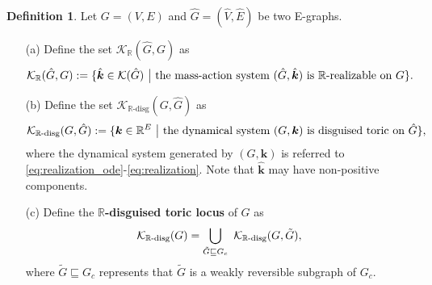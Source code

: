 \documentclass[11pt]{article}
\theoremstyle{plain}
\theoremstyle{definition}
\newtheorem{definition}[theorem]{Definition}
\theoremstyle{remark}
\newcommand\RR{\mathbb{R}}
\newcommand\bk{\boldsymbol{k}}
\newcommand{\mK}{\mathcal{K}}
\newcommand{\dK}{\mathcal{K}_{\RR\text{-disg}}}
\newcommand{\defi}{\textbf}
\begin{document}
\begin{definition} 
\label{def:de_realizable}
Let $G =(V,E)$ and $\hat{G} =(\hat{V}, \hat{E})$ be two E-graphs.
\begin{enumerate}


\item[(a)] Define the set $\mK_{\RR}(\hat{G}, G)$ as 
\begin{equation} \notag
\mK_{\RR}(\hat{G}, G) := \{ \hat{\bk} \in \mK (\hat{G}) \ \big| \ \text{the mass-action system } (\hat{G}, \hat{\bk}) \ \text{is $\RR$-realizable on } G \}.
\end{equation}

%

\item[(b)] Define the set $\dK(G, \hat{G})$ as
\begin{equation} \notag
\dK(G, \hat{G}) := \{ \bk \in \mathbb{R}^{E} \ \big| \ \text{the dynamical system} \ (G, \bk) \ \text{is disguised toric on } \hat{G} \},
\end{equation}
where the dynamical system generated by $(G, \bk)$ is referred to \eqref{eq:realization_ode}-\eqref{eq:realization}. Note that $\hat{\bk}$ may have non-positive components.


\item[(c)] Define the \defi{$\RR$-disguised toric locus} of $G$ as
\begin{equation} \notag
\dK(G) = \bigcup_{\tilde{G} \sqsubseteq G_{c}} \ \dK(G, \tilde{G}),
\end{equation}
where $\tilde{G}\sqsubseteq G_{c}$ represents that
$\tilde{G}$ is a weakly reversible subgraph of $ G_{c}$.
\end{enumerate}

\end{definition}
\end{document}
